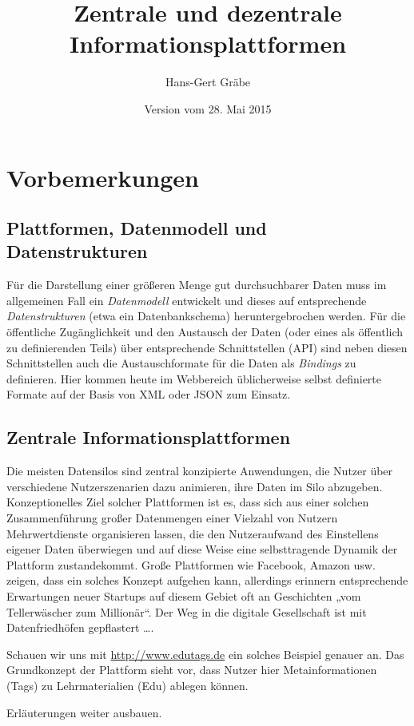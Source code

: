 \documentclass[a4paper,11pt]{article}
\title{Zentrale und dezentrale Informationsplattformen}
\author{Hans-Gert Gräbe}
\date{Version vom 28. Mai 2015}
\begin{document}
\maketitle

\section{Vorbemerkungen}

\subsection{Plattformen, Datenmodell und Datenstrukturen}

Für die Darstellung einer größeren Menge gut durchsuchbarer Daten muss im
allgemeinen Fall ein \emph{Datenmodell} entwickelt und dieses auf entsprechende
\emph{Datenstrukturen} (etwa ein Datenbankschema) heruntergebrochen werden.
Für die öffentliche Zugänglichkeit und den Austausch der Daten (oder eines als
öffentlich zu definierenden Teils) über entsprechende Schnittstellen (API) sind
neben diesen Schnittstellen auch die Austauschformate für die Daten als
\emph{Bindings} zu definieren. Hier kommen heute im Webbereich üblicherweise
selbst definierte Formate auf der Basis von XML oder JSON zum Einsatz.

\subsection{Zentrale Informationsplattformen}

Die meisten Datensilos sind zentral konzipierte Anwendungen, die Nutzer über
verschiedene Nutzerszenarien dazu animieren, ihre Daten im Silo abzugeben.
Konzeptionelles Ziel solcher Plattformen ist es, dass sich aus einer solchen
Zusammenführung großer Datenmengen einer Vielzahl von Nutzern Mehrwertdienste
organisieren lassen, die den Nutzeraufwand des Einstellens eigener Daten
überwiegen und auf diese Weise eine selbsttragende Dynamik der Plattform
zustandekommt. Große Plattformen wie Facebook, Amazon usw. zeigen, dass ein
solches Konzept aufgehen kann, allerdings erinnern entsprechende Erwartungen
neuer Startups auf diesem Gebiet oft an Geschichten „vom Tellerwäscher zum
Millionär“. Der Weg in die digitale Gesellschaft ist mit Datenfriedhöfen
gepflastert {\ldots}.

Schauen wir uns mit \url{http://www.edutags.de} ein solches Beispiel genauer
an.  Das Grundkonzept der Plattform sieht vor, dass Nutzer hier
Metainformationen (Tags) zu Lehrmaterialien (Edu) ablegen können.
\begin{center}
  Erläuterungen weiter ausbauen.
\end{center}
\end{document}

